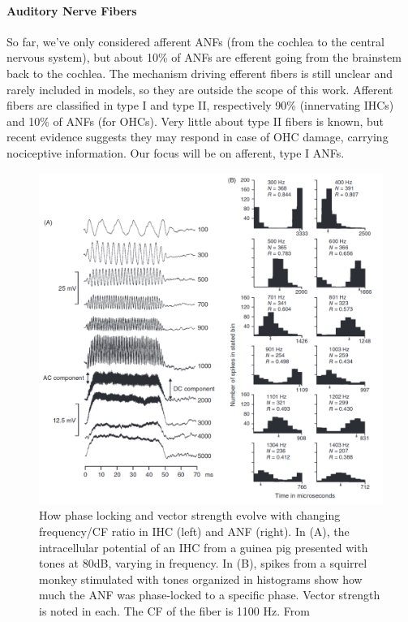 \documentclass[11pt,a4paper]{article}
\begin{document}
\paragraph{Auditory Nerve Fibers}
So far, we've only considered afferent ANFs (from the cochlea to the central nervous system), but about 10\% of ANFs are efferent going from the brainstem back to the cochlea. The mechanism driving efferent fibers is still unclear and rarely included in models, so they are outside the scope of this work. Afferent fibers are classified in type I and type II, respectively 90\% (innervating IHCs) and 10\% of ANFs (for OHCs). Very little about type II fibers is known, but recent evidence suggests they may respond in case of OHC damage, carrying nociceptive information. Our focus will be on afferent, type I ANFs.


\begin{figure}
    \centering
    \includegraphics[width=0.6\linewidth]{Images/real_cochlea_phaselock.png}
    \caption{How phase locking and vector strength evolve with changing frequency/CF ratio in IHC (left) and ANF (right). In (A), the intracellular potential of an IHC from a guinea pig presented with tones at 80dB, varying in frequency. In (B), spikes from a squirrel monkey stimulated with tones organized in histograms show how much the ANF was phase-locked to a specific phase. Vector strength is noted in each. The CF of the fiber is 1100 Hz. From \cite{yinNeuralMechanismsBinaural2019}}
    \label{fig:real-ihc-anf-phaselock}
\end{figure}
\end{document}
